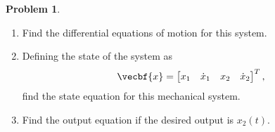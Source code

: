 \documentclass[10pt]{article}
\theoremstyle{definition}
\newtheorem{prob}{Problem}[section]
\newenvironment{subprob}%
{\renewcommand{\theenumi}{\alph{enumi}}\renewcommand{\labelenumi}{(\theenumi)}\begin{enumerate}}%
{\end{enumerate}}%
\begin{document}
\begin{prob}
    \begin{subprob}
        \item Find the differential equations of motion for this system.
        \item Defining the state of the system as
            \begin{align*}
                \vecbf{x} = \begin{bmatrix} x_1 & \dot{x}_1 & x_2 & \dot{x}_2 \end{bmatrix}^T ,
            \end{align*}
            find the state equation for this mechanical system.
        \item Find the output equation if the desired output is \( x_2(t) \).
    \end{subprob}
\end{prob}
\end{document}

